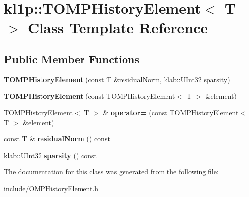 \hypertarget{classkl1p_1_1TOMPHistoryElement}{}\section{kl1p\+:\+:T\+O\+M\+P\+History\+Element$<$ T $>$ Class Template Reference}
\label{classkl1p_1_1TOMPHistoryElement}
\subsection*{Public Member Functions}
\begin{DoxyCompactItemize}
\item 
{\bfseries T\+O\+M\+P\+History\+Element} (const T \&residual\+Norm, klab\+::\+U\+Int32 sparsity)\hypertarget{classkl1p_1_1TOMPHistoryElement_ad332e75e61839bfdf7fe3f616b21415b}{}\label{classkl1p_1_1TOMPHistoryElement_ad332e75e61839bfdf7fe3f616b21415b}

\item 
{\bfseries T\+O\+M\+P\+History\+Element} (const \hyperlink{classkl1p_1_1TOMPHistoryElement}{T\+O\+M\+P\+History\+Element}$<$ T $>$ \&element)\hypertarget{classkl1p_1_1TOMPHistoryElement_a356ae4961475e32994bd231c17cbda58}{}\label{classkl1p_1_1TOMPHistoryElement_a356ae4961475e32994bd231c17cbda58}

\item 
\hyperlink{classkl1p_1_1TOMPHistoryElement}{T\+O\+M\+P\+History\+Element}$<$ T $>$ \& {\bfseries operator=} (const \hyperlink{classkl1p_1_1TOMPHistoryElement}{T\+O\+M\+P\+History\+Element}$<$ T $>$ \&element)\hypertarget{classkl1p_1_1TOMPHistoryElement_a634ba6a8ef3e86603ce30d5c9ac3b104}{}\label{classkl1p_1_1TOMPHistoryElement_a634ba6a8ef3e86603ce30d5c9ac3b104}

\item 
const T \& {\bfseries residual\+Norm} () const \hypertarget{classkl1p_1_1TOMPHistoryElement_a46727be27590a595e1cb992d829ec09a}{}\label{classkl1p_1_1TOMPHistoryElement_a46727be27590a595e1cb992d829ec09a}

\item 
klab\+::\+U\+Int32 {\bfseries sparsity} () const \hypertarget{classkl1p_1_1TOMPHistoryElement_a64af007ffb26ab95e43fb7360748a5fe}{}\label{classkl1p_1_1TOMPHistoryElement_a64af007ffb26ab95e43fb7360748a5fe}

\end{DoxyCompactItemize}


The documentation for this class was generated from the following file\+:\begin{DoxyCompactItemize}
\item 
include/O\+M\+P\+History\+Element.\+h\end{DoxyCompactItemize}
